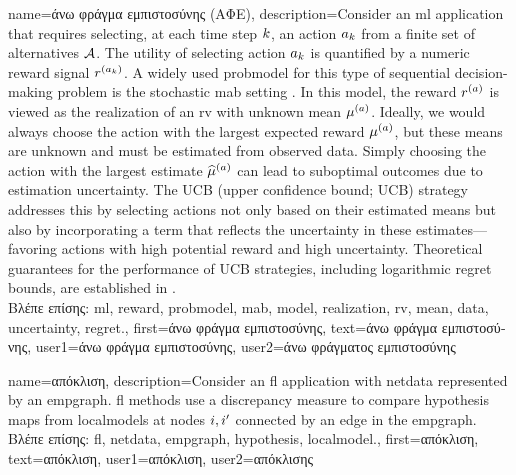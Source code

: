 {name={\foreignlanguage{greek}{άνω φράγμα εμπιστοσύνης (ΑΦΕ)}},
	description={Consider an \gls{ml} 
		application that requires selecting, at each time step $k$, an action $a_{k}$ 
		from a finite set of alternatives $\mathcal{A}$. The utility of selecting action $a_{k}$ 
		is quantified by a numeric \gls{reward} signal $r^{(a_{k})}$. 
		A widely used \gls{probmodel} for this type of sequential decision-making problem 
		is the stochastic \gls{mab} setting \cite{Bubeck2012}. In this \gls{model}, 
		the \gls{reward} $r^{(a)}$ is viewed as the \gls{realization} of an \gls{rv} 
		with unknown \gls{mean} $\mu^{(a)}$. Ideally, we would always choose the 
		action with the largest expected \gls{reward} $\mu^{(a)}$, but these 
		\gls{mean}s are unknown and must be estimated from observed \gls{data}. Simply 
		choosing the action with the largest estimate $\widehat{\mu}^{(a)}$ can 
		lead to suboptimal outcomes due to estimation \gls{uncertainty}. The UCB (upper confidence bound; UCB) strategy 
		addresses this by selecting actions not only based on their estimated \gls{mean}s but 
		also by incorporating a term that reflects the \gls{uncertainty} in these estimates—favoring 
		actions with high potential \gls{reward} and high \gls{uncertainty}. Theoretical guarantees 
		for the performance of UCB strategies, including logarithmic \gls{regret} bounds, are established in \cite{Bubeck2012}.\\
		\foreignlanguage{greek}{Βλέπε επίσης:} \gls{ml}, \gls{reward}, \gls{probmodel}, \gls{mab}, \gls{model}, \gls{realization}, \gls{rv}, \gls{mean}, \gls{data}, \gls{uncertainty}, \gls{regret}.},
	first={\foreignlanguage{greek}{άνω φράγμα εμπιστοσύνης}},
	text={\foreignlanguage{greek}{άνω φράγμα εμπιστοσύνης}},
	user1={\foreignlanguage{greek}{άνω φράγμα εμπιστοσύνης}}, %
    	user2={\foreignlanguage{greek}{άνω φράγματος εμπιστοσύνης}} %
}

{name={\foreignlanguage{greek}{απόκλιση}},
	description={Consider an \gls{fl} application with \gls{netdata} 
		represented by an \gls{empgraph}. \gls{fl} methods use a discrepancy measure 
		to compare \gls{hypothesis} maps from \gls{localmodel}s at nodes $i,i'$ 
		connected by an edge in the \gls{empgraph}.\\
		\foreignlanguage{greek}{Βλέπε επίσης:} \gls{fl}, \gls{netdata}, \gls{empgraph}, \gls{hypothesis}, \gls{localmodel}.},
	first={\foreignlanguage{greek}{απόκλιση}},
	text={\foreignlanguage{greek}{απόκλιση}},
	user1={\foreignlanguage{greek}{απόκλιση}}, %
	user2={\foreignlanguage{greek}{απόκλισης}} %
}

